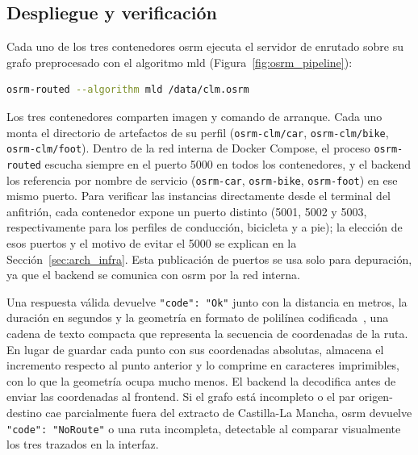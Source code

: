 \subsection{Despliegue y verificación}
\label{subsec:impl_osrm_despliegue}

Cada uno de los tres contenedores \gls{osrm} ejecuta el servidor de enrutado sobre su grafo preprocesado con el algoritmo \gls{mld} (Figura~\ref{fig:osrm_pipeline}):\newline

\begin{lstlisting}[language=bash]
osrm-routed --algorithm mld /data/clm.osrm
\end{lstlisting}

Los tres contenedores comparten imagen y comando de arranque. Cada uno monta el directorio de artefactos de su perfil (\texttt{osrm-clm/car}, \texttt{osrm-clm/bike}, \texttt{osrm-clm/foot}). Dentro de la red interna de Docker Compose, el proceso \texttt{osrm-routed} escucha siempre en el puerto 5000 en todos los contenedores, y el backend los referencia por nombre de servicio (\texttt{osrm-car}, \texttt{osrm-bike}, \texttt{osrm-foot}) en ese mismo puerto. Para verificar las instancias directamente desde el terminal del anfitrión, cada contenedor expone un puerto distinto (5001, 5002 y 5003, respectivamente para los perfiles de conducción, bicicleta y a pie); la elección de esos puertos y el motivo de evitar el 5000 se explican en la Sección~\ref{sec:arch_infra}. Esta publicación de puertos se usa solo para depuración, ya que el backend se comunica con \gls{osrm} por la red interna.
\newpage

Una respuesta válida devuelve \texttt{"code": "Ok"} junto con la distancia en metros, la duración en segundos y la geometría en formato de polilínea codificada~\cite{GooglePolyline}, una cadena de texto compacta que representa la secuencia de coordenadas de la ruta. En lugar de guardar cada punto con sus coordenadas absolutas, almacena el incremento respecto al punto anterior y lo comprime en caracteres imprimibles, con lo que la geometría ocupa mucho menos. El backend la decodifica antes de enviar las coordenadas al frontend. Si el grafo está incompleto o el par origen-destino cae parcialmente fuera del extracto de Castilla-La Mancha, \gls{osrm} devuelve \texttt{"code": "NoRoute"} o una ruta incompleta, detectable al comparar visualmente los tres trazados en la interfaz.\newline


